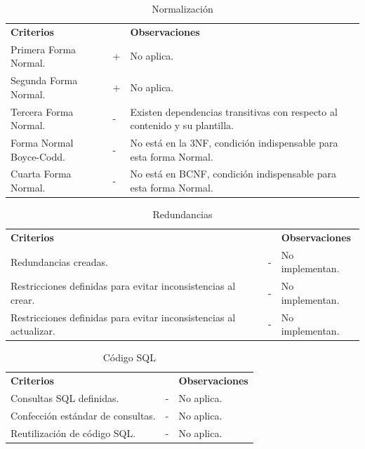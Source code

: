 \documentclass[10pt,times,twocolumn]{article}
\begin{document}
\begin{table}[H]
    \centering
    \begin{tabular}{p{3cm}p{0.3cm}p{3.7cm}}
        \rowcolor{gray!15}
        \textbf{Criterios} &  & \textbf{Observaciones} \\
        Primera Forma Normal. & + & No aplica. \\
       	Segunda Forma Normal. & + & No aplica. \\
       	Tercera Forma Normal. & - & Existen dependencias transitivas con respecto al contenido y su plantilla. \\
       	Forma Normal Boyce-Codd. & - & No está en la 3NF, condición indispensable para esta forma Normal. \\
       	Cuarta Forma Normal. & - & No está en BCNF, condición indispensable para esta forma Normal. \\
    \end{tabular}
    \caption{Normalización}
    \label{tab:normalizacion}
\end{table}

\begin{table}[H]
    \centering
    \begin{tabular}{p{3cm}p{0.3cm}p{3.7cm}}
        \rowcolor{gray!15}
        \textbf{Criterios} &  & \textbf{Observaciones} \\
        Redundancias creadas. & - & No implementan. \\
       	Restricciones definidas para evitar inconsistencias al crear. & - & No implementan. \\
       	Restricciones definidas para evitar inconsistencias al actualizar. & - & No implementan. \\
    \end{tabular}
    \caption{Redundancias}
    \label{tab:redundancias}
\end{table}

\begin{table}[H]
    \centering
    \begin{tabular}{p{3cm}p{0.3cm}p{3.7cm}}
        \rowcolor{gray!15}
        \textbf{Criterios} &  & \textbf{Observaciones} \\
        Consultas SQL definidas. & - & No aplica. \\
       	Confección estándar de consultas. & - & No aplica. \\
       	Reutilización de código SQL. & - & No aplica. \\
    \end{tabular}
    \caption{Código SQL}
    \label{tab:codigo_sql}
\end{table}
\end{document}
